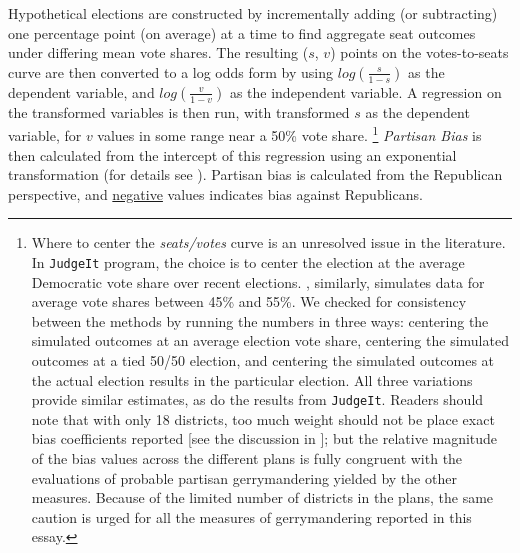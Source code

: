 \par
    Hypothetical elections are constructed by incrementally adding (or subtracting) one percentage point (on average) at a time to find aggregate seat outcomes under differing mean vote shares. The resulting ($s$, $v$) points on the votes-to-seats curve are then converted to a log odds form by using $ log(\frac{s}{1-s}) $ as the dependent variable, and $ log(\frac{v}{1-v}) $ as the independent variable. A regression on the transformed variables is then run, with transformed $s$ as the dependent variable, for $v$ values in some range near a 50\% vote share. 
    \footnote{Where to center the \textit{seats/votes} curve is an unresolved issue in the literature. In \citet{GelmanKing1994_unifiedAJPS} \texttt{JudgeIt} program, the choice is to center the election at the average Democratic vote share over recent elections. \citet{Kastellec_et_al_2008_PS}, similarly, simulates data for average vote shares between 45\% and 55\%. We checked for consistency between the methods by running the numbers in three ways: centering the simulated outcomes at an average election vote share, centering the simulated outcomes at a tied 50/50 election, and centering the simulated outcomes at the actual election results in the particular election. All three variations provide similar estimates, as do the results from \texttt{JudgeIt}. Readers should note that with only 18 districts, too much weight should not be place exact bias coefficients reported [see the discussion in \citet{Browning_King_1987_seats_votes}]; but the relative magnitude of the bias values across the different plans is fully congruent with the evaluations of probable partisan gerrymandering yielded by the other measures. Because of the limited number of districts in the plans, the same caution is urged for all the measures of gerrymandering reported in this essay.} 
    \textit{Partisan Bias} is then calculated from the intercept of this regression using an exponential transformation (for details see \citet{Grofman1983}). Partisan bias is calculated from the Republican perspective, and \underline{negative} values indicates bias against Republicans.
\par
